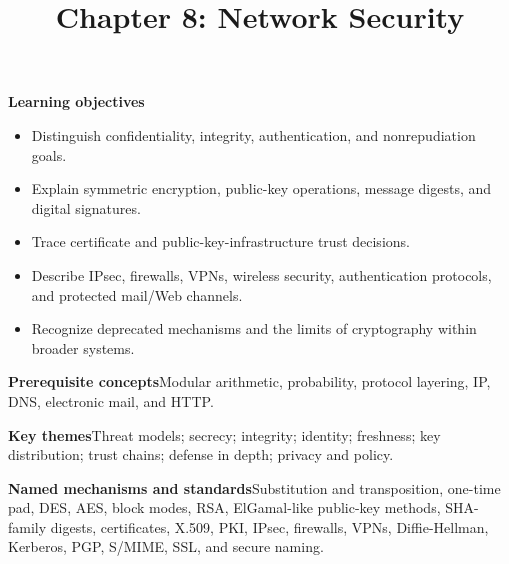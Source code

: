 \documentclass[10pt,letterpaper]{article}
\title{Chapter 8: Network Security}
\author{}
\date{}
\begin{document}
\maketitle
{}
\begin{overviewbox}
\textbf{Learning objectives}\begin{itemize}
  \item Distinguish confidentiality, integrity, authentication, and nonrepudiation goals.
  \item Explain symmetric encryption, public-key operations, message digests, and digital signatures.
  \item Trace certificate and public-key-infrastructure trust decisions.
  \item Describe IPsec, firewalls, VPNs, wireless security, authentication protocols, and protected mail/Web channels.
  \item Recognize deprecated mechanisms and the limits of cryptography within broader systems.
\end{itemize}
\textbf{Prerequisite concepts}\quad Modular arithmetic, probability, protocol layering, IP, DNS, electronic mail, and HTTP.\par
\textbf{Key themes}\quad Threat models; secrecy; integrity; identity; freshness; key distribution; trust chains; defense in depth; privacy and policy.\par
\textbf{Named mechanisms and standards}\quad Substitution and transposition, one-time pad, DES, AES, block modes, RSA, ElGamal-like public-key methods, SHA-family digests, certificates, X.509, PKI, IPsec, firewalls, VPNs, Diffie-Hellman, Kerberos, PGP, S/MIME, SSL, and secure naming.
\end{overviewbox}

\end{document}
